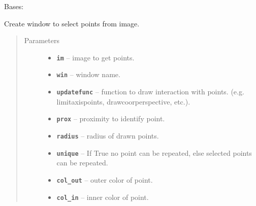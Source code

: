 \documentclass[letterpaper,10pt,english]{sphinxmanual}
\begin{document}
\begin{fulllineitems}
\label{RRtoolbox.lib:RRtoolbox.lib.image.getCoors}
Bases: {\hyperref[RRtoolbox.lib:RRtoolbox.lib.plotter.plotim]{\emph{}}}

Create window to select points from image.
\begin{quote}\begin{description}
\item[{Parameters}] \leavevmode\begin{itemize}
\item {} 
\textbf{\texttt{im}} -- image to get points.

\item {} 
\textbf{\texttt{win}} -- window name.

\item {} 
\textbf{\texttt{updatefunc}} -- function to draw interaction with points.
(e.g. limitaxispoints, drawcoorperspective, etc.).

\item {} 
\textbf{\texttt{prox}} -- proximity to identify point.

\item {} 
\textbf{\texttt{radius}} -- radius of drawn points.

\item {} 
\textbf{\texttt{unique}} -- If True no point can be repeated,
else selected points can be repeated.

\item {} 
\textbf{\texttt{col\_out}} -- outer color of point.

\item {} 
\textbf{\texttt{col\_in}} -- inner color of point.

\end{itemize}

\end{description}\end{quote}

\begin{fulllineitems}
\label{RRtoolbox.lib:RRtoolbox.lib.image.getCoors.coors}
\end{fulllineitems}


\end{fulllineitems}
\end{document}
